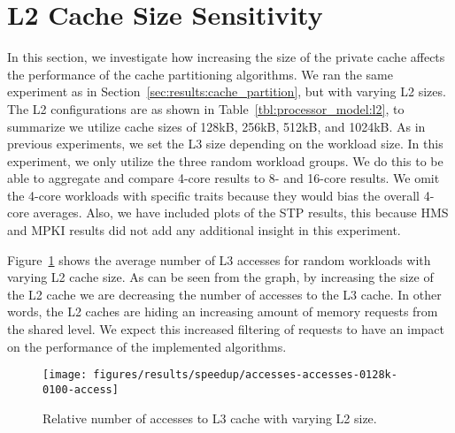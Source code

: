 \section{L2 Cache Size Sensitivity}
\label{sec:results:l2size_sensitivity}

In this section, we investigate how increasing the size of the private cache affects the performance of the cache partitioning algorithms.
We ran the same experiment as in Section~\ref{sec:results:cache_partition}, but with varying L2 sizes.
The L2 configurations are as shown in Table~\ref{tbl:processor_model:l2}, to summarize we utilize cache sizes of 128kB, 256kB, 512kB, and 1024kB.
As in previous experiments, we set the L3 size depending on the workload size.
In this experiment, we only utilize the three random workload groups.
We do this to be able to aggregate and compare 4-core results to 8- and 16-core results.
We omit the 4-core workloads with specific traits because they would bias the overall 4-core averages.
Also, we have included plots of the STP results, this because HMS and MPKI results did not add any additional insight in this experiment.

Figure~\ref{fig:results:l2:access} shows the average number of L3 accesses for random workloads with varying L2 cache size.
As can be seen from the graph, by increasing the size of the L2 cache we are decreasing the number of accesses to the L3 cache.
In other words, the L2 caches are hiding an increasing amount of memory requests from the shared level.
We expect this increased filtering of requests to have an impact on the performance of the implemented algorithms.



\begin{figure}[th]
    \centering
    \texttt{[image: figures/results/speedup/accesses-accesses-0128k-0100-access]}
    \caption{Relative number of accesses to L3 cache with varying L2 size.}
    \label{fig:results:l2:access}
\end{figure}

